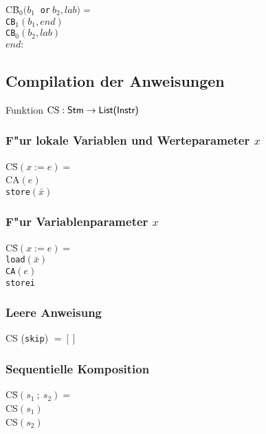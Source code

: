 \documentclass[german,10pt, a4paper, twocolumn]{scrartcl}
\theoremstyle{definition}
\theoremstyle{remark}
\begin{document}
\begin{tabbing}
 CB\=$_0(b_1\ $ \tt{or}$ \ b_2,lab) =$ \\
 \>	CB$_1(b_1,end)$\\
 \>	CB$_0(b_2,lab)$\\
 $end:$
\end{tabbing}

\subsection{Compilation der Anweisungen}

Funktion $\mbox{CS}:\mbox{\sffamily Stm} \rightarrow \mbox{\sffamily List(Instr)}$

\subsubsection{F"ur lokale Variablen und Werteparameter $x$}

\begin{tabbing}
 CS\=$(x := e) =$ \\
 \>	CA$(e)$\\
 \>	\tt{store}$(\bar{x})$
\end{tabbing}

\subsubsection{F"ur Variablenparameter $x$}

\begin{tabbing}
 CS\=$(x := e) =$ \\
 \>	\tt{load}$(\bar{x})$\\
 \>	CA$(e)$\\
 \>	\tt{storei}
\end{tabbing}

\subsubsection{Leere Anweisung}

CS (\texttt{skip}) $= []$ 

\subsubsection{Sequentielle Komposition}

\begin{tabbing}
 CS\=$(s_1\ ;\ s_2) =$ \\
 \>	CS$(s_1)$\\
 \>	CS$(s_2)$
\end{tabbing}
\end{document}
